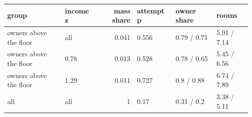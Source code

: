\begingroup\small
\setlength{\tabcolsep}{3pt}
\renewcommand{\arraystretch}{1.04}
\begin{tabularx}{\linewidth}{XXrXXX}
\toprule
group & income z & mass share & attempt p & owner share & rooms \\
\midrule
owners above the floor & all & 0.041 & 0.556 & 0.79 / 0.71 & 5.91 / 7.14 \\
owners above the floor & 0.78 & 0.013 & 0.528 & 0.78 / 0.65 & 5.45 / 6.56 \\
owners above the floor & 1.29 & 0.011 & 0.727 & 0.8 / 0.88 & 6.74 / 7.89 \\
all & all & 1 & 0.17 & 0.31 / 0.2 & 3.38 / 5.11 \\
\bottomrule
\end{tabularx}
\endgroup
